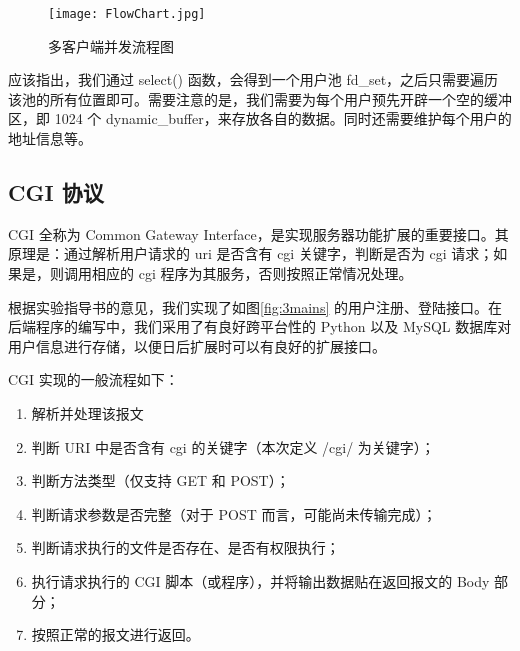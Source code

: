 \begin{figure}[htbp!]
  \centering
  \texttt{[image: FlowChart.jpg]}
  \caption{多客户端并发流程图}\label{fig:MultipleChart}
\end{figure}

应该指出，我们通过 select() 函数，会得到一个用户池 fd\_set，之后只需要遍历该池的所有位置即可。需要注意的是，我们需要为每个用户预先开辟一个空的缓冲区，即 1024 个 dynamic\_buffer，来存放各自的数据。同时还需要维护每个用户的地址信息等。

\subsection{CGI 协议}\label{sec:CGI}

CGI 全称为 Common Gateway Interface，是实现服务器功能扩展的重要接口。其原理是：通过解析用户请求的 uri 是否含有 cgi 关键字，判断是否为 cgi 请求；如果是，则调用相应的 cgi 程序为其服务，否则按照正常情况处理。

根据实验指导书的意见，我们实现了如图\ref{fig:3mains} 的用户注册、登陆接口。在后端程序的编写中，我们采用了有良好跨平台性的 Python 以及 MySQL 数据库对用户信息进行存储，以便日后扩展时可以有良好的扩展接口。


CGI 实现的一般流程如下：
\begin{enumerate}
  \item 解析并处理该报文
  \item 判断 URI 中是否含有 cgi 的关键字（本次定义 /cgi/ 为关键字）；
  \item 判断方法类型（仅支持 GET 和 POST）；
  \item 判断请求参数是否完整（对于 POST 而言，可能尚未传输完成）；
  \item 判断请求执行的文件是否存在、是否有权限执行；
  \item 执行请求执行的 CGI 脚本（或程序），并将输出数据贴在返回报文的 Body 部分；
  \item 按照正常的报文进行返回。
\end{enumerate}


